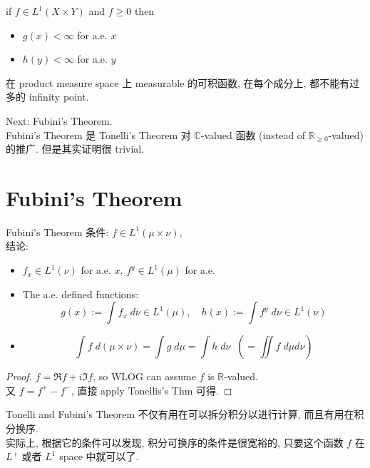\documentclass[lang=cn,11pt]{elegantbook}
\begin{document}
\begin{corollary}
    if $f \in L^1(X\times Y)$ and $f \geq 0$ then 
    \begin{itemize}
        \item     $g(x) < \infty$ for a.e. $x$
        \item $h(y) < \infty$ for a.e. $y$
    \end{itemize}
\end{corollary}
\begin{remark}
    在 product measure space 上 measurable 的可积函数, 在每个成分上, 都不能有过多的 infinity point.
\end{remark}
Next: Fubini's Theorem.\\
Fubini's Theorem 是 Tonelli's Theorem 对 $\mathbb{C}$-valued 函数 (instead of $\mathbb{R}_{\geq 0}$-valued) 的推广. 但是其实证明很 trivial. 
\section{Fubini's Theorem}
\begin{theorem}{Fubini's Theorem}
 条件: $f \in L^1(\mu \times \nu)$,\\
 结论:
    \begin{itemize}
        \item $f_x \in L^1(\nu)$ for a.e. $x$, $f^y \in L^1(\mu)$ for a.e. 
        \item The a.e. defined functions: \[ g(x) := \int f_x \;d\nu \in L^1(\mu),\quad h(x) := \int f^y \;d\nu \in L^1(\nu) \]
        \item \[ \int f \; d(\mu \times \nu)  = \int g \; d\mu = \int h \; d\nu  \;\; (= \iint f\; d\mu d\nu)\]
    \end{itemize}
\end{theorem}
\begin{proof}
\(f = \Re f + i \Im f \), so WLOG can assume $f$ is $\mathbb{R}$-valued.\\
又 $f = f^+ - f^-$, 直接 apply Tonellis's Thm 可得.
\end{proof}
\begin{remark}
    Tonelli and Fubini's Theorem 不仅有用在可以拆分积分以进行计算, 而且有用在积分换序. \\
    实际上, 根据它的条件可以发现, 积分可换序的条件是很宽裕的, 只要这个函数 $f$ 在 $L^+$ 或者 $L^1$ space 中就可以了.
\end{remark}
\end{document}
